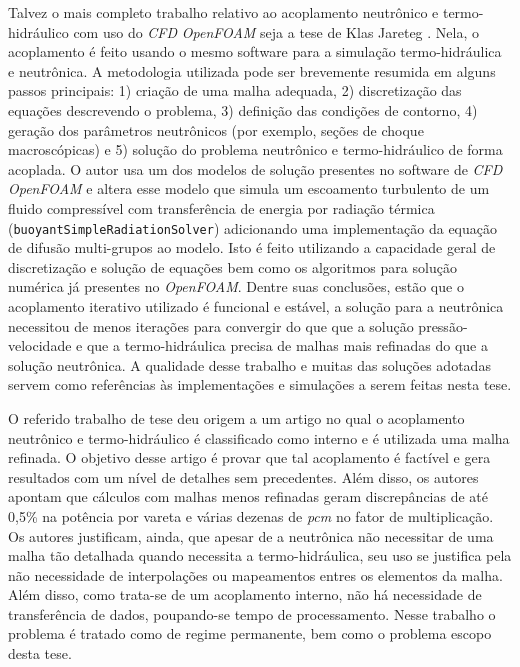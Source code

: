 Talvez o mais completo trabalho relativo ao acoplamento neutrônico e termo-hidráulico com uso do 
\textit{CFD} \textit{OpenFOAM} seja a tese de Klas Jareteg \cite{Jareteg2012}. Nela, o acoplamento é feito usando o mesmo 
software para a simulação termo-hidráulica e neutrônica. A metodologia utilizada pode ser brevemente 
resumida em alguns passos principais: 1) criação de uma malha adequada, 2) discretização das 
equações descrevendo o problema, 3) definição das condições de contorno, 4) geração dos 
parâmetros neutrônicos (por exemplo, seções de choque macroscópicas) e 5) solução do 
problema neutrônico e termo-hidráulico de forma acoplada. O autor usa um dos modelos de solução presentes no 
software de \textit{CFD} \textit{OpenFOAM} \cite{OpenFOAM2013} e 
altera esse modelo que simula um escoamento turbulento de um fluido compressível com transferência de energia
por radiação térmica (\texttt{buoyantSimpleRadiationSolver}) adicionando uma implementação da equação de difusão multi-grupos 
ao modelo. Isto é feito utilizando a capacidade geral de discretização e solução de equações bem como os algoritmos 
para solução numérica já presentes no \textit{OpenFOAM}. Dentre suas conclusões, estão que o acoplamento iterativo 
utilizado é funcional e estável, a solução para a neutrônica necessitou de menos iterações para convergir 
do que que a solução pressão-velocidade e que a termo-hidráulica precisa de malhas mais refinadas do que a solução 
neutrônica. A qualidade desse trabalho e muitas das soluções adotadas servem como referências às implementações 
e simulações a serem feitas nesta tese.

O referido trabalho de tese deu origem a um artigo \cite{Jareteg2014} no qual o acoplamento
neutrônico e termo-hidráulico é classificado como interno e é utilizada uma malha
refinada. O objetivo desse artigo é provar que
tal acoplamento é factível e gera resultados com um nível de detalhes sem precedentes. Além
disso, os autores apontam que cálculos com malhas menos refinadas geram discrepâncias
de até 0,5\% na potência por vareta e várias dezenas de \textit{pcm} no fator de multiplicação.
Os autores justificam, ainda, que apesar de a neutrônica não necessitar de uma malha
tão detalhada quando necessita a termo-hidráulica, seu uso se justifica pela não necessidade
de interpolações ou mapeamentos entres os elementos da malha. Além disso, como trata-se
de um acoplamento interno, não há necessidade de transferência de dados, poupando-se
tempo de processamento.
Nesse trabalho o problema é tratado como de regime permanente, bem como o problema escopo
desta tese.


